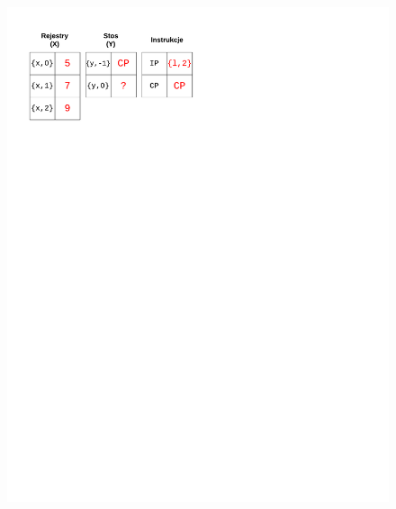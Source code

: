 \begin{figure}
\begin{multicols}{2}
\vspace{-4mm}
\begin{Figure}
 \centering
 \includegraphics[scale=0.65, clip, trim=0 215mm 110mm 0]{interpreter_max_2}
\label{fig:max2}
\end{Figure}


\end{multicols}
\end{figure}
